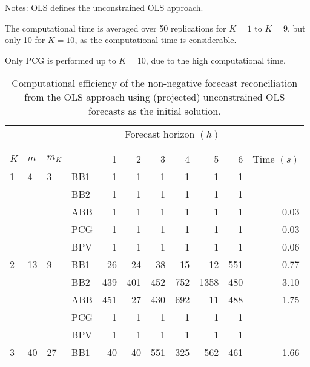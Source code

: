 \documentclass[11pt]{article}
\newcommand{\0}{\phantom{0}}
\begin{document}
\begin{table}[ht]
\begin{threeparttable}
\begin{tabular}{llllrrrrrrr}
			\bottomrule
		\end{tabular}
		\begin{tablenotes}
			\item [] Notes: OLS defines the unconstrained OLS approach. 
			\item [] The computational time is averaged over 50 replications for $K = 1$ to $K = 9$, but only 10 for $K = 10$, as the computational time is considerable.
			\item [] Only PCG is performed up to $K = 10$, due to the high computational time.	
		\end{tablenotes}
	\end{threeparttable}
\end{table}

\begin{table}[ht]
	\small
	\tabcolsep=0.20cm
	\caption{Computational efficiency of the non-negative forecast reconciliation from the OLS approach using (projected) unconstrained OLS forecasts as the initial solution.}
	\label{tbl:perfnnolsp}
	\centering
	\begin{threeparttable}
		\begin{tabular}{llllrrrrrrr}
			\toprule
			& & & & \multicolumn{6}{c}{Forecast horizon $(h)$}\\[-0.4cm]\\\cline{5-10}\\[-0.3cm]
			$K$ & $m$ & $m_{K}$ & & 1 & 2 & 3 & 4 & 5 & 6 & Time $(s)$\\ 
			\midrule
			1 & 4 & 3 & BB1 & 1 & 1 & 1 & 1 & 1 & 1 & \pmb{$0.02$} \\
			& & & BB2 & 1 & 1 & 1 & 1 & 1 & 1 & \pmb{$0.02$} \\
			& & & ABB & 1 & 1 & 1 & 1 & 1 & 1 & 0.03 \\
			& & & PCG & 1 & 1 & 1 & 1 & 1 & 1 & 0.03 \\
			& & & BPV & 1 & 1 & 1 & 1 & 1 & 1 & 0.06 \\
			\midrule
			2 & 13 & 9 & BB1 & 26 & 24 & 38 & 15 & 12 & 551 & 0.77 \\			
			& & & BB2 & 439 & 401 & 452 & 752 & 1358 & 480 & 3.10 \\
			& & & ABB & 451 & 27 & 430 & 692 & 11 & 488 & 1.75 \\
			& & & PCG & 1 & 1 & 1 & 1 & 1 & 1 & \pmb{$0.07$} \\
			& & & BPV & 1 & 1 & 1 & 1 & 1 & 1 & \pmb{$0.07$} \\
			\midrule
			3 & 40 & 27 & BB1 & 40 & 40 & 551 & 325 & 562 & 461 & 1.66 \\

\end{tabular}
\end{threeparttable}
\end{table}
\end{document}
